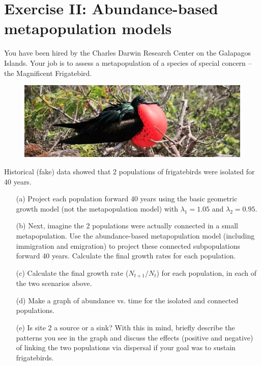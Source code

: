 \documentclass[12pt]{article}\usepackage[]{graphicx}\usepackage[]{xcolor}
\begin{document}
\clearpage


\section*{Exercise II: Abundance-based metapopulation models }
You have been hired by the Charles Darwin Research Center on the
Galapagos Islands. Your job is to assess a metapopulation of a species
of special concern -- the Magnificent Frigatebird.

\begin{figure}[h!]
  \centering
  \includegraphics[width=\textwidth]{figs/frigatebird}
  \label{fig:frig}
\end{figure}

\vspace{-24pt}

Historical (fake) data showed that 2 populations of frigatebirds were
isolated for 40 years.

\begin{enumerate}
  \item[(a)] Project each population forward 40 years using the basic
    geometric growth model (not the metapopulation model) with
    $\lambda_1=1.05$ and $\lambda_2=0.95$. 
  \item[(b)] Next, imagine the 2 populations were actually connected
    in a small metapopulation. Use the abundance-based metapopulation
    model (including immigration and emigration) to project these
    connected subpopulations forward 40 years. Calculate the final
    growth rates for each population.
  \item[(c)] Calculate the final growth rate ($N_{t+1}/N_t$) for each population, in each of the two scenarios above. 
  \item[(d)] Make a graph of abundance vs. time for the isolated and
    connected populations.
  \item[(e)] Is site 2 a source or a sink? With this in mind,
    briefly describe the patterns you see in the graph and discuss the
    effects (positive and negative) of linking the two populations via
    dispersal if your goal was to sustain frigatebirds.
\end{enumerate}
\end{document}
